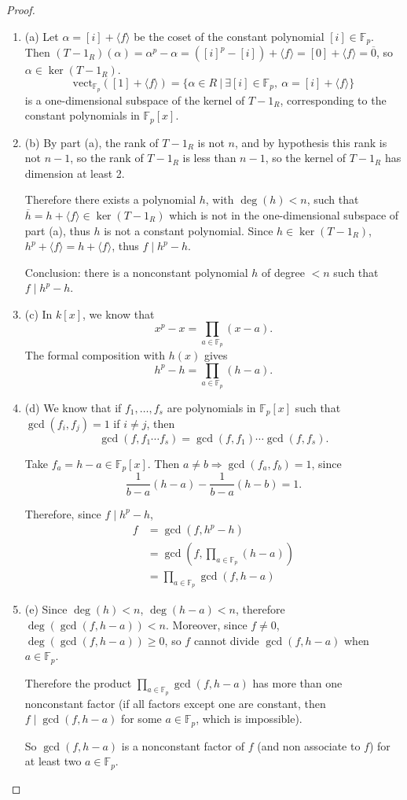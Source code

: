 \documentclass[11pt,a4paper]{article}
\newcommand{\be} {\begin{enumerate}}
\newcommand{\ee} {\end{enumerate}}
\newcommand{\F}{\mathbb{F}}
\begin{document}
\begin{proof}
\be
\item[(a)] Let $\alpha = [i] + \langle f \rangle$ be the coset of the constant polynomial $[i] \in \F_p$. Then $(T -1_R)(\alpha) = \alpha^p - \alpha = ([i]^p - [i]) + \langle f \rangle = [0] + \langle f \rangle = \overline{0}$, so $\alpha \in \ker(T-1_R)$. 
$$\mathrm{vect}_{\F_p} ([1]+ \langle f \rangle) = \{\alpha \in R\ | \ \exists [i] \in \F_p, \ \alpha = [i] + \langle f \rangle\}$$
is a one-dimensional subspace of the kernel of $T-1_R$, corresponding to the constant polynomials in $\F_p[x]$.

\item[(b)] By part (a), the rank of $T-1_R$ is not $n$, and by hypothesis this rank is not $n-1$, so the rank of $T-1_R$ is less than $n-1$, so the kernel of $T-1_R$ has dimension at least 2.

Therefore there exists a polynomial $h$, with $\deg(h)<n$, such that $\overline{h} = h + \langle f \rangle \in \ker(T-1_R)$ which is not in the one-dimensional subspace of part (a), thus $h$ is not a constant polynomial. Since $h \in \ker(T-1_R)$, $h^p + \langle f \rangle = h + \langle f \rangle$, thus $f \mid h^p-h$.

Conclusion: there is a nonconstant polynomial $h$ of degree $<n$ such that $f \mid h^p - h$.

\item[(c)] In $k[x]$, we know that
$$x^p -x = \prod_{a \in \F_p} (x- a).$$
The formal composition with $h(x)$ gives
$$h^p -h = \prod_{a \in \F_p} (h- a).$$

\item[(d)] We know that if $f_1,\ldots,f_s$ are  polynomials in $\F_p[x]$ such that $\gcd(f_i,f_j)=1$ if $i\ne j$, then
$$\gcd(f,f_1\cdots f_s) = \gcd(f,f_1) \cdots \gcd(f,f_s).$$

Take $f_a = h-a \in \F_p[x]$. Then  $a \ne b \Rightarrow \gcd(f_a,f_b) = 1$, since $$\frac{1}{b-a} (h-a) - \frac{1}{b-a}(h-b) = 1.$$

Therefore, since $f \mid h^p-h$,
\begin{align*}
f &= \gcd(f,h^p-h)\\
&= \gcd(f,  \prod_{a \in \F_p} (h- a))\\
&=  \prod_{a \in \F_p} \gcd(f,h-a)
\end{align*}

\item[(e)] Since $\deg(h)<n$, $\deg(h-a)<n$, therefore $\deg(\gcd(f,h-a))<n$. Moreover, since $f \ne 0$, $\deg(\gcd(f,h-a))\geq  0$, so $f$ cannot divide $\gcd(f,h-a)$ when $a \in \F_p$. 

Therefore the product $\prod_{a \in \F_p} \gcd(f,h-a)$ has more than one nonconstant factor (if all factors except one are constant, then $f \mid \gcd(f,h-a)$ for some $a \in \F_p$, which is impossible). 

So $\gcd(f,h-a)$ is a nonconstant factor of $f$ (and non associate to $f$) for at least two $a\in \F_p$.
\ee
\end{proof}
\end{document}

